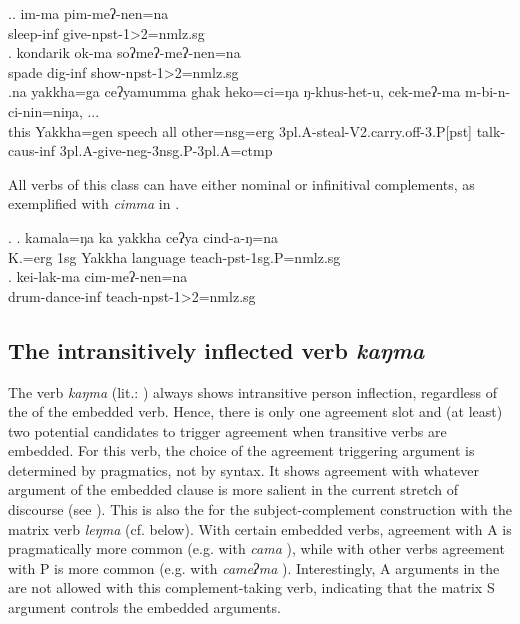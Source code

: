 \ex.\ag. im-ma pim-meʔ-nen=na\\
	sleep-{\sc inf} give-{\sc npst-1>2=nmlz.sg}\\
	\bg. kondarik ok-ma soʔmeʔ-meʔ-nen=na\\
	spade dig{\sc -inf} show{\sc -npst-1>2=nmlz.sg}		\\
	\bg.na   yakkha=ga ceʔyamumma ghak     heko=ci=ŋa      ŋ-khus-het-u, cek-meʔ-ma m-bi-n-ci-nin=niŋa,  ...  \\
this Yakkha{\sc =gen}  speech all other{\sc =nsg=erg} {\sc 3pl.A-}steal{\sc -V2.carry.off-3.P[pst]} talk{\sc -caus-inf} {\sc 3pl.A-}give{\sc -neg-3nsg.P-3pl.A=ctmp} \\
 
	
	
All verbs of this class can have either nominal or infinitival complements, as exemplified with \emph{cimma}  in \Next.

\ex. \ag. kamala=ŋa ka yakkha ceʔya cind-a-ŋ=na\\
		K.{\sc =erg} {\sc 1sg} Yakkha language teach{\sc [3sg.A]-pst-1sg.P=nmlz.sg}	\\
 	\bg. kei-lak-ma cim-meʔ-nen=na\\
	drum-dance-{\sc inf} teach{\sc -npst-1>2=nmlz.sg}\\

	
\subsection{The intransitively inflected verb  \emph{kaŋma} }

The verb \emph{kaŋma}   (lit.: ) always shows intransitive person inflection, regardless of the  of the embedded verb. Hence, there is only one agreement slot and (at least) two potential candidates to trigger  agreement when transitive verbs are embedded. For this  verb, the choice of the agreement triggering argument is determined by pragmatics, not by syntax. It shows agreement with whatever argument of the embedded clause is more salient in the current stretch of discourse (see \Next). This is also the  for the subject-complement construction with the matrix verb \emph{leŋma}  (cf.  below). With certain embedded verbs, agreement with A is pragmatically more common (e.g. with \emph{cama} ), while with other  verbs agreement with P is more common (e.g. with \emph{cameʔma} ). Interestingly, A arguments in the   are not allowed with this complement-taking verb, indicating that the matrix S argument controls the embedded arguments.

